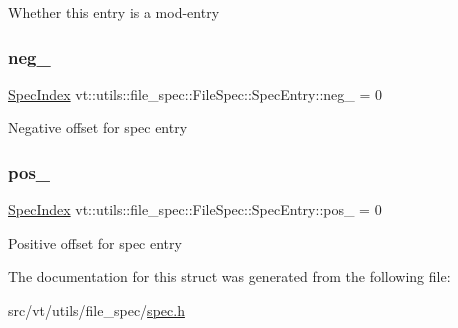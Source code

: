 Whether this entry is a mod-\/entry \mbox{\label{structvt_1_1utils_1_1file__spec_1_1_file_spec_1_1_spec_entry_a23da7a0e8133ec0145b5de803c6b5237}} 
\subsubsection{\texorpdfstring{neg\+\_\+}{neg\_}}
{\footnotesize\ttfamily \hyperlink{structvt_1_1utils_1_1file__spec_1_1_file_spec_a3817fca09dbe932e0f6ba5729f1965ba}{Spec\+Index} vt\+::utils\+::file\+\_\+spec\+::\+File\+Spec\+::\+Spec\+Entry\+::neg\+\_\+ = 0\hspace{0.3cm}{\ttfamily [private]}}

Negative offset for spec entry \mbox{\label{structvt_1_1utils_1_1file__spec_1_1_file_spec_1_1_spec_entry_af8f716fd38fc23b6adb04b113199814e}} 
\subsubsection{\texorpdfstring{pos\+\_\+}{pos\_}}
{\footnotesize\ttfamily \hyperlink{structvt_1_1utils_1_1file__spec_1_1_file_spec_a3817fca09dbe932e0f6ba5729f1965ba}{Spec\+Index} vt\+::utils\+::file\+\_\+spec\+::\+File\+Spec\+::\+Spec\+Entry\+::pos\+\_\+ = 0\hspace{0.3cm}{\ttfamily [private]}}

Positive offset for spec entry 

The documentation for this struct was generated from the following file\+:\begin{DoxyCompactItemize}
\item 
src/vt/utils/file\+\_\+spec/\hyperlink{spec_8h}{spec.\+h}\end{DoxyCompactItemize}
